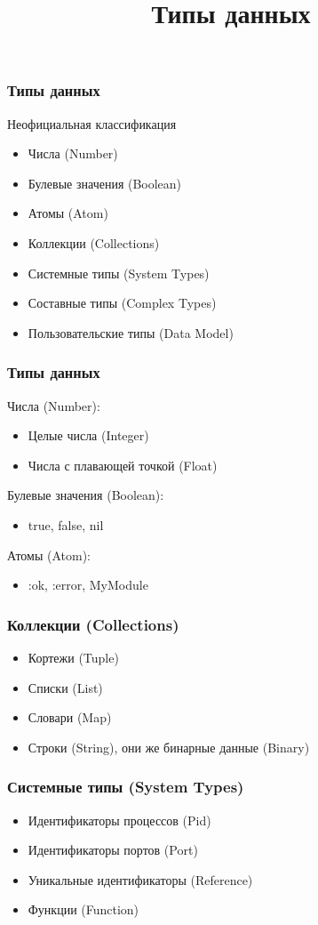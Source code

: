 \documentclass[10pt]{beamer}
\title{Типы данных}
\begin{document}
\begin{frame}
  \frametitle{Типы данных}
  Неофициальная классификация
  \par \bigskip
  \begin{itemize}
    \item Числа (Number)
    \item Булевые значения (Boolean)
    \item Атомы (Atom)
    \item Коллекции (Collections)
    \item Системные типы (System Types)
    \item Составные типы (Complex Types)
    \item Пользовательские типы (Data Model)
  \end{itemize}
\end{frame}

\begin{frame}
  \frametitle{Типы данных}
  Числа (Number):
  \begin{itemize}
    \item Целые числа (Integer)
    \item Числа с плавающей точкой (Float)
  \end{itemize}
  \par \bigskip
  Булевые значения (Boolean):
  \begin{itemize}
    \item true, false, nil
  \end{itemize}
  \par \bigskip
  Атомы (Atom):
  \begin{itemize}
    \item :ok, :error, MyModule
  \end{itemize}
\end{frame}

\begin{frame}
  \frametitle{Коллекции (Collections)}
  \begin{itemize}
    \item Кортежи (Tuple)
    \item Списки (List)
    \item Словари (Map)
    \item Строки (String), они же бинарные данные (Binary)
  \end{itemize}
\end{frame}

\begin{frame}
  \frametitle{Системные типы (System Types)}
  \begin{itemize}
    \item Идентификаторы процессов (Pid)
    \item Идентификаторы портов (Port)
    \item Уникальные идентификаторы (Reference)
    \item Функции (Function)
  \end{itemize}
\end{frame}
\end{document}
